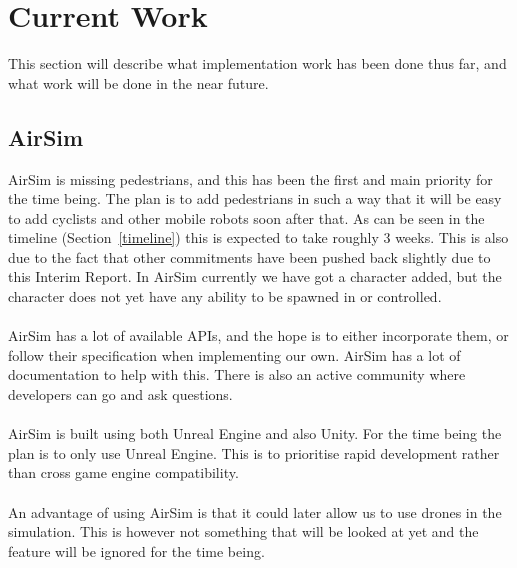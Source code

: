 \section{Current Work}
This section will describe what implementation work has been done thus far, and what work will be done in the near future.
\subsection{AirSim}
AirSim is missing pedestrians, and this has been the first and main priority for the time being. The plan is to add pedestrians in such a way that it will be easy to add cyclists and other mobile robots soon after that. As can be seen in the timeline (Section~\ref{timeline}) this is expected to take roughly 3 weeks. This is also due to the fact that other commitments have been pushed back slightly due to this Interim Report. In AirSim currently we have got a character added, but the character does not yet have any ability to be spawned in or controlled.
\\~\\
AirSim has a lot of available APIs, and the hope is to either incorporate them, or follow their specification when implementing our own. AirSim has a lot of documentation to help with this. There is also an active community where developers can go and ask questions. 
\\~\\
AirSim is built using both Unreal Engine and also Unity. For the time being the plan is to only use Unreal Engine. This is to prioritise rapid development rather than cross game engine compatibility. 
\\~\\
An advantage of using AirSim is that it could later allow us to use drones in the simulation. This is however not something that will be looked at yet and the feature will be ignored for the time being. 

